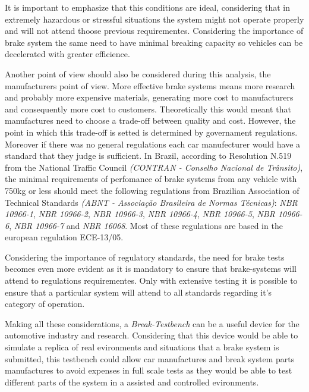 		It is important to emphasize that this conditions are ideal, considering that in extremely hazardous or stressful situations the system might not operate properly and will not attend thoose previous requirementes. Considering the importance of brake system the same need to have minimal breaking capacity so vehicles can be decelerated with greater efficience. 
		\par
		Another point of view should also be considered during this analysis, the manufacturers point of view. More effective brake systems means more research and probably more expensive materials, generating more cost to manufacturers and consequently more cost to customers. Theoretically this would meant that manufactures need to choose a trade-off between quality and cost. However, the point in which this trade-off is setted is determined by governament regulations. Moreover if there was no general regulations each car manufecturer would have a standard that they judge is sufficient. In Brazil, according to Resolution N.519 \cite{contran519} from the National Traffic Council \textit{(CONTRAN - Conselho Nacional de Trânsito)}, the minimal requirements of perfomance of brake systems from any vehicle with 750kg or less should meet the following regulations from Brazilian Association of Technical Standards \textit{(ABNT - Associação Brasileira de Normas Técnicas)}: \textit{NBR 10966-1}, \textit{NBR 10966-2}, \textit{NBR 10966-3}, \textit{NBR 10966-4}, \textit{NBR 10966-5}, \textit{NBR 10966-6}, \textit{NBR 10966-7} and \textit{NBR 16068}. Most of these regulations are based in the european regulation ECE-13/05.
		\par
		Considering the importance of regulatory standards, the need for brake tests becomes even more evident as it is mandatory to ensure that brake-systems will attend to regulations requirementes. Only with extensive testing it is possible to ensure that a particular system will attend to all standards regarding it's category of operation. 
		\par
		Making all these considerations, a \textit{Break-Testbench} can be a useful device for the automotive industry and research. Considering that this device would be able to simulate a replica of real evironments and situations that a brake system is submitted, this testbench could allow car manufactures and break system parts manufactures to avoid expenses in full scale tests as they would be able to test different parts of the system in a assisted and controlled evironments.